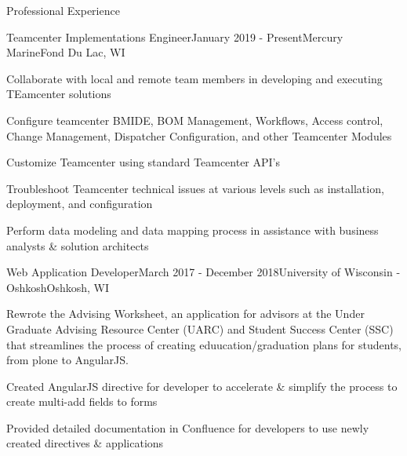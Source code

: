\documentclass{resume} %
\begin{document}
\begin{rSection}{Professional Experience}

    \begin{rSubsection}{Teamcenter Implementations Engineer}{January 2019 - Present}{Mercury Marine}{Fond Du Lac, WI}
        \item Collaborate with local and remote team members in developing and executing TEamcenter solutions
        \item Configure teamcenter BMIDE, BOM Management, Workflows, Access control, Change Management, Dispatcher Configuration, and other Teamcenter Modules
        \item Customize Teamcenter using standard Teamcenter API's
        \item Troubleshoot Teamcenter technical issues at various levels such as installation, deployment, and configuration
        \item Perform data modeling and data mapping process in assistance with business analysts \& solution architects
    \end{rSubsection}

    \begin{rSubsection}{Web Application Developer}{March 2017 - December 2018}{University of Wisconsin - Oshkosh}{Oshkosh, WI}
        \item Rewrote the Advising Worksheet, an application for advisors at the Under Graduate Advising Resource Center (UARC) and 
            Student Success Center (SSC) that streamlines the process of creating eduucation/graduation plans for students, from 
            plone to AngularJS. 
        \item Created AngularJS directive for developer to accelerate \& simplify the process to create multi-add fields to forms
        \item Provided detailed documentation in Confluence for developers to use newly created directives \& applications
    \end{rSubsection}


\end{rSection}
\end{document}
